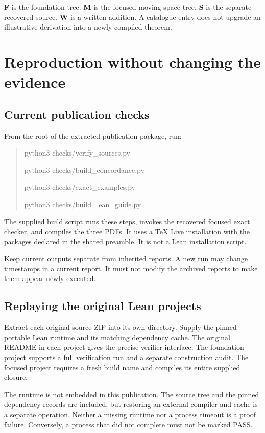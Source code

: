 \documentclass[11pt]{article}
\begin{document}
\textbf{F} is the foundation tree. \textbf{M} is the focused moving-space tree. \textbf{S} is the separate recovered source. \textbf{W} is a written addition. A catalogue entry does not upgrade an illustrative derivation into a newly compiled theorem.


\clearpage\section{Reproduction without changing the evidence}
\subsection{Current publication checks}
From the root of the extracted publication package, run:
\begin{quote}\small\ttfamily
python3 checks/verify\_sources.py\par
python3 checks/build\_concordance.py\par
python3 checks/exact\_examples.py\par
python3 checks/build\_lean\_guide.py
\end{quote}
The supplied build script runs these steps, invokes the recovered focused exact checker, and compiles the three PDFs. It uses a TeX Live installation with the packages declared in the shared preamble. It is not a Lean installation script.

Keep current outputs separate from inherited reports. A new run may change timestamps in a current report. It must not modify the archived reports to make them appear newly executed.

\subsection{Replaying the original Lean projects}
Extract each original source ZIP into its own directory. Supply the pinned portable Lean runtime and its matching dependency cache. The original README in each project gives the precise verifier interface. The foundation project supports a full verification run and a separate construction audit. The focused project requires a fresh build name and compiles its entire supplied closure.

The runtime is not embedded in this publication. The source tree and the pinned dependency records are included, but restoring an external compiler and cache is a separate operation. Neither a missing runtime nor a process timeout is a proof failure. Conversely, a process that did not complete must not be marked PASS.
\end{document}
